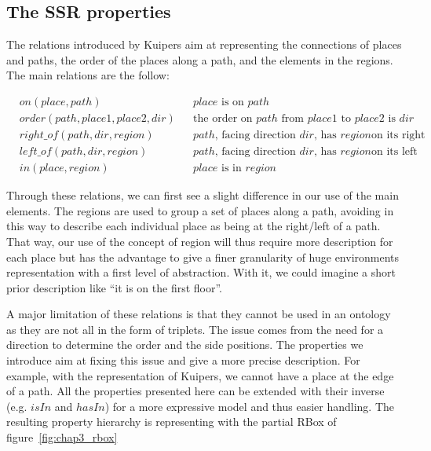 \subsection{The SSR properties}

The relations introduced by Kuipers aim at representing the connections of places and paths, the order of the places along a path, and the elements in the regions. The main relations are the follow:

\begin{align*}
&on(place,path) && place \text{ is on } path \\
&order(path,place1,place2,dir) && \text{the order on } path \text{ from } place1 \text{ to } place2 \text{ is } dir \\
&right\_of(path,dir,region) && path \text{, facing direction } dir \text{, has } region \text{on its right}\\
&left\_of(path,dir,region) && path \text{, facing direction } dir \text{, has } region \text{on its left} \\
&in(place,region) && place \text{ is in } region
\end{align*}

Through these relations, we can first see a slight difference in our use of the main elements. The regions are used to group a set of places along a path, avoiding in this way to describe each individual place as being at the right/left of a path. That way, our use of the concept of region will thus require more description for each place but has the advantage to give a finer granularity of huge environments representation with a first level of abstraction. With it, we could imagine a short prior description like ``it is on the first floor''.

A major limitation of these relations is that they cannot be used in an ontology as they are not all in the form of triplets. The issue comes from the need for a direction to determine the order and the side positions. The properties we introduce aim at fixing this issue and give a more precise description. For example, with the representation of Kuipers, we cannot have a place at the edge of a path. All the properties presented here can be extended with their inverse (e.g. $isIn$ and $hasIn$) for a more expressive model and thus easier handling. The resulting property hierarchy is representing with the partial RBox of figure~\ref{fig:chap3_rbox} 

